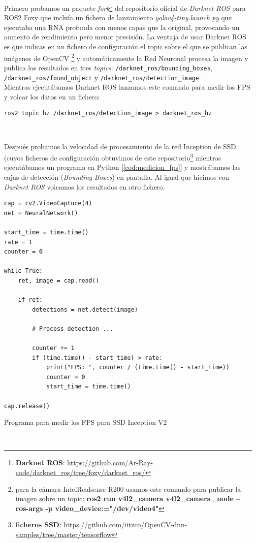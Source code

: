Primero probamos un paquete \textit{fork}\footnote{\textbf{Darknet ROS}: \url{https://github.com/Ar-Ray-code/darknet_ros/tree/foxy/darknet_ros/}} del repositorio oficial de \textit{Darknet ROS} para ROS2 Foxy que incluía un fichero de lanzamiento \textit{yolov4-tiny.launch.py} que ejecutaba una RNA profunda con menos capas que la original, provocando un aumento de rendimiento pero menor precisión. La ventaja de usar Darknet ROS es que indicas en un fichero de configuración el topic sobre el que se publican las imágenes de OpenCV \footnote{para la cámara IntelRealsense R200 usamos este comando para publicar la imagen sobre un topic: \textbf{ros2 run v4l2\_camera v4l2\_camera\_node --ros-args -p video\_device:="/dev/video4"}} y automáticamente la Red Neuronal procesa la imagen y publica los resultados en tres \textit{topics}: \texttt{/darknet\_ros/bounding\_boxes}, \texttt{/darknet\_ros/found\_object} y \texttt{/darknet\_ros/detection\_image}.\\

Mientras ejecutábamos Darknet ROS lanzamos este comando para medir los FPS y volcar los datos en un fichero:\\

\begin{lstlisting}
ros2 topic hz /darknet_ros/detection_image > darknet_ros_hz
\end{lstlisting}\

Después probamos la velocidad de procesamiento de la red Inception de SSD (cuyos ficheros de configuración obtuvimos de este repositorio\footnote{\textbf{ficheros SSD}: \url{https://github.com/iitzco/OpenCV-dnn-samples/tree/master/tensorflow}} mientras ejecutábamos un programa en Python [\ref{cod:medicion_fps}] y mostrábamos las cajas de detección (\textit{Bounding Boxes}) en pantalla. Al igual que hicimos con \textit{Darknet ROS} volcamos los resultados en otro fichero.\\

\begin{code}[H]
\begin{lstlisting}
cap = cv2.VideoCapture(4)
net = NeuralNetwork()

start_time = time.time()
rate = 1
counter = 0

while True:
	ret, image = cap.read()
	
	if ret:
		detections = net.detect(image)
		
		# Process detection ...

		counter += 1
		if (time.time() - start_time) > rate:
			print("FPS: ", counter / (time.time() - start_time))
			counter = 0
			start_time = time.time()

cap.release()
\end{lstlisting}
\caption{Programa para medir los FPS para SSD Inception V2}
\label{cod:medicion_fps}
\end{code}\

